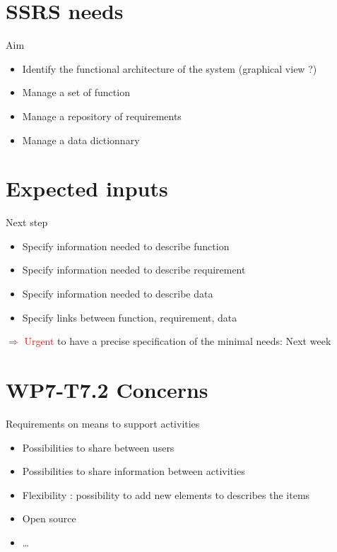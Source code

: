 
\section{SSRS needs}


\begin{frame}{Aim}

  \begin{itemize}
  \item
    Identify the functional architecture of the system (graphical view ?)
  \item
    Manage a set of function
  \item 
  	Manage a repository of requirements
  \item 
  	Manage a data dictionnary
  \end{itemize}

\end{frame}

\section{Expected inputs}

\begin{frame}{Next step}

  \begin{itemize}
  \item
    Specify information needed to describe function
  \item
    Specify information needed to  describe requirement
  \item 
  	Specify information needed to describe data
  \item 
  	Specify links between function, requirement, data
  \end{itemize}
  
  \textcolor{red}{$ \Rightarrow $ Urgent} to have a precise specification of the minimal needs:  Next week

\end{frame}


\section{WP7-T7.2 Concerns}


\begin{frame}{Requirements on means to support activities}

  \begin{itemize}
  \item
    Possibilities to share between users
  \item
    Possibilities to share information between activities
  \item 
  	Flexibility : possibility to add new elements to describes the items
  \item
  Open source
  \item 
  	\dots
  \end{itemize}
  
\end{frame}



